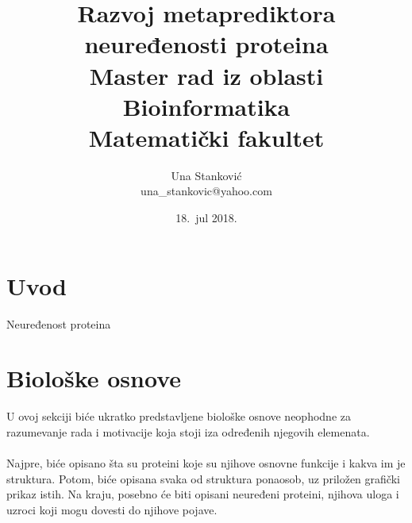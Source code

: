 \documentclass[a4paper]{article}
\begin{document}
\title{Razvoj metaprediktora neuređenosti proteina\\ \small{Master rad iz oblasti\\Bioinformatika\\ Matematički fakultet}}

\author{Una Stanković\\ una\_stankovic@yahoo.com}
\date{18.~jul 2018.}
\maketitle


\tableofcontents

\newpage

\section{Uvod}
\label{sec:uvod}
Neuređenost proteina 

\section{Biološke osnove}
\label{sec:prvi}
U ovoj sekciji biće ukratko predstavljene biološke osnove neophodne za razumevanje rada i motivacije koja stoji iza određenih njegovih elemenata.\\\\
Najpre, biće opisano šta su proteini koje su njihove osnovne funkcije i kakva im je struktura. Potom, biće opisana svaka od struktura ponaosob, uz priložen grafički prikaz istih. Na kraju, posebno će biti opisani neuređeni proteini, njihova uloga i uzroci koji mogu dovesti do njihove pojave. 
\end{document}
